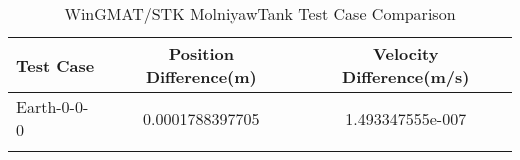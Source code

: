 \begin{table}[htbp!]
\centering
\caption{ WinGMAT/STK MolniyawTank Test Case Comparison}
      \begin{tabular}{lcc}
      \hline\hline
          Test Case & Position Difference(m) & Velocity Difference(m/s) \\
         \hline
         Earth-0-0-0 & 0.0001788397705 & 1.493347555e-007 \\
      \hline\hline
      \label{Table: MolniyawTank WinGMAT-STK Table} 
\end{tabular}
\end{table}

